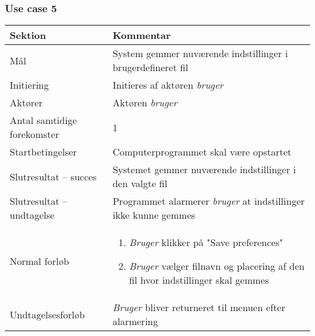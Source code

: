 \documentclass[rapport.tex]{subfiles}
\begin{document}
		\subsubsection{Use case 5}
		\begin{tabular}{|l|p{7.7cm}|}
			\hline \textbf{Sektion} 	& \textbf{Kommentar} \\ 
			\hline Mål  & System gemmer nuværende indstillinger i brugerdefineret fil \\ 
			\hline Initiering  & Initieres af aktøren \textit{bruger} \\ 
			\hline Aktører & Aktøren \textit{bruger} \\ 
			\hline Antal samtidige forekomster & 1 \\ 
			\hline Startbetingelser & Computerprogrammet skal være opstartet \\ 
			\hline Slutresultat – succes & Systemet gemmer nuværende indstillinger i den valgte fil \\ 
			\hline Slutresultat – undtagelse & Programmet alarmerer \textit{bruger} at indstillinger ikke kunne gemmes \\ 
			\hline Normal forløb & \begin{enumerate}
				\item \textit{Bruger} klikker på "Save preferences"
				\item \textit{Bruger} vælger filnavn og placering af den fil hvor indstillinger skal gemmes
			\end{enumerate} \\ 
			\hline Undtagelsesforløb & \textit{Bruger} bliver returneret til menuen efter alarmering \\ 
			\hline 
		\end{tabular}
			
\end{document}
